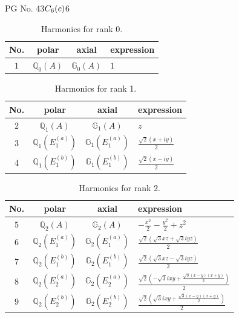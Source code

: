 \documentclass[fleqn,8pt,landscape]{jsarticle}
\begin{document}
\setcounter{MaxMatrixCols}{32}

\renewcommand{\tablename}{Table~}
\renewcommand{\figurename}{Figure~}
\begin{center}
\LARGE
PG No. 43\quad$C_{\rm 6}(c)$\quad$6$\quad[ hexagonal ]
\end{center}
\begin{table}[ht!]
\begin{center}
\caption{Harmonics for rank 0.}
\renewcommand{\arraystretch}{1.3}
\begin{tabular}{cccl} \hline \hline
No. & polar & axial & expression \\ \hline
$ 1 $ & $ \mathbb{Q}_{0}(A) $ & $ \mathbb{G}_{0}(A) $ & $ 1 $ \\
 \hline \hline
\end{tabular}
\end{center}
\end{table}
\begin{table}[ht!]
\begin{center}
\caption{Harmonics for rank 1.}
\renewcommand{\arraystretch}{1.3}
\begin{tabular}{cccl} \hline \hline
No. & polar & axial & expression \\ \hline
$ 2 $ & $ \mathbb{Q}_{1}(A) $ & $ \mathbb{G}_{1}(A) $ & $ z $ \\
$ 3 $ & $ \mathbb{Q}_{1}(E_{1}^{(a)}) $ & $ \mathbb{G}_{1}(E_{1}^{(a)}) $ & $ \frac{\sqrt{2} \left(x + i y\right)}{2} $ \\
$ 4 $ & $ \mathbb{Q}_{1}(E_{1}^{(b)}) $ & $ \mathbb{G}_{1}(E_{1}^{(b)}) $ & $ \frac{\sqrt{2} \left(x - i y\right)}{2} $ \\
 \hline \hline
\end{tabular}
\end{center}
\end{table}
\begin{table}[ht!]
\begin{center}
\caption{Harmonics for rank 2.}
\renewcommand{\arraystretch}{1.3}
\begin{tabular}{cccl} \hline \hline
No. & polar & axial & expression \\ \hline
$ 5 $ & $ \mathbb{Q}_{2}(A) $ & $ \mathbb{G}_{2}(A) $ & $ - \frac{x^{2}}{2} - \frac{y^{2}}{2} + z^{2} $ \\
$ 6 $ & $ \mathbb{Q}_{2}(E_{1}^{(a)}) $ & $ \mathbb{G}_{2}(E_{1}^{(a)}) $ & $ \frac{\sqrt{2} \left(\sqrt{3} x z + \sqrt{3} i y z\right)}{2} $ \\
$ 7 $ & $ \mathbb{Q}_{2}(E_{1}^{(b)}) $ & $ \mathbb{G}_{2}(E_{1}^{(b)}) $ & $ \frac{\sqrt{2} \left(\sqrt{3} x z - \sqrt{3} i y z\right)}{2} $ \\
$ 8 $ & $ \mathbb{Q}_{2}(E_{2}^{(a)}) $ & $ \mathbb{G}_{2}(E_{2}^{(a)}) $ & $ \frac{\sqrt{2} \left(- \sqrt{3} i x y + \frac{\sqrt{3} \left(x - y\right) \left(x + y\right)}{2}\right)}{2} $ \\
$ 9 $ & $ \mathbb{Q}_{2}(E_{2}^{(b)}) $ & $ \mathbb{G}_{2}(E_{2}^{(b)}) $ & $ \frac{\sqrt{2} \left(\sqrt{3} i x y + \frac{\sqrt{3} \left(x - y\right) \left(x + y\right)}{2}\right)}{2} $ \\
 \hline \hline
\end{tabular}
\end{center}
\end{table}
\end{document}
